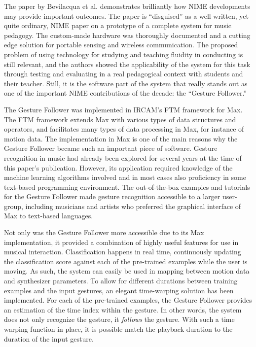 The paper by Bevilacqua et al. demonstrates brilliantly how NIME developments may provide important outcomes. The paper is ``disguised'' as a well-written, yet quite ordinary, NIME paper on a prototype of a complete system for music pedagogy. The custom-made hardware was thoroughly documented and a cutting edge solution for portable sensing and wireless communication. The proposed problem of using technology for studying and teaching fluidity in conducting is still relevant, and the authors showed the applicability of the system for this task through testing and evaluating in a real pedagogical context with students and their teacher. Still, it is the software part of the system that really stands out as one of the important NIME contributions of the decade: the ``Gesture Follower.''

The Gesture Follower was implemented in IRCAM's FTM framework for Max. The FTM framework extends Max with various types of data structures and operators, and facilitates many types of data processing in Max, for instance of motion data. The implementation in Max is one of the main reasons why the Gesture Follower became such an important piece of software. Gesture recognition in music had already been explored for several years at the time of this paper's publication. However, its application required knowledge of the machine learning algorithms involved and in most cases also proficiency in some text-based programming environment. The out-of-the-box examples and tutorials for the Gesture Follower made gesture recognition accessible to a larger user-group, including musicians and artists who preferred the graphical interface of Max to text-based languages. 

Not only was the Gesture Follower more accessible due to its Max implementation, it provided a combination of highly useful features for use in musical interaction. Classification happens in real time, continuously updating the classification score against each of the pre-trained examples while the user is moving. As such, the system can easily be used in mapping between motion data and synthesizer parameters. To allow for different durations between training examples and the input gestures, an elegant time-warping solution has been implemented. For each of the pre-trained examples, the Gesture Follower provides an estimation of the time index within the gesture. In other words, the system does not only recognize the gesture, it \emph{follows} the gesture. With such a time warping function in place, it is possible match the playback duration to the duration of the input gesture.


